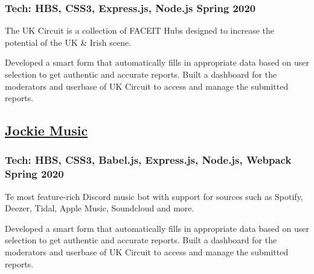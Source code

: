 \subsubsection*{
  Tech: HBS, CSS3, Express.js, Node.js
  \hspace*{\fill}
  Spring 2020
}
The UK Circuit is a collection of FACEIT Hubs designed to increase the potential of the
UK \& Irish scene.
\begin{tasks}
  \task Developed a smart form that automatically fills in appropriate data based on
  user selection to get authentic and accurate reports.
  \task Built a dashboard for the moderators and userbase of UK Circuit to access and manage
  the submitted reports.
\end{tasks}
%
%
%
%
\subsection*{
  \href{https://bumbleboss.xyz/w/jockiemusic}{Jockie Music}
}
\subsubsection*{
  Tech: HBS, CSS3, Babel.js, Express.js, Node.js, Webpack
  \hspace*{\fill}
  Spring 2020
}
Te most feature-rich Discord music bot with support for sources such as Spotify,
Deezer, Tidal, Apple Music, Soundcloud and more.
\begin{tasks}
  \task Developed a smart form that automatically fills in appropriate data based on
  user selection to get authentic and accurate reports.
  \task Built a dashboard for the moderators and userbase of UK Circuit to access and manage
  the submitted reports.
\end{tasks}
